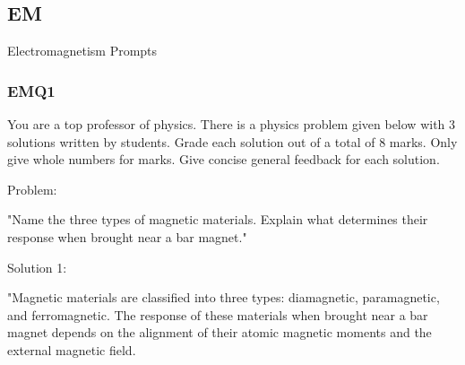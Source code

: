 




\subsection{EM}

Electromagnetism Prompts

\subsubsection{EMQ1}

You are a top professor of physics. There is a physics problem given below with 3 solutions written by students. Grade each solution out of a total of 8 marks. Only give whole numbers for marks. Give concise general feedback for each solution. 

Problem: 

"Name the three types of magnetic materials. Explain what determines their response when brought near a bar magnet."

Solution 1: 

"Magnetic materials are classified into three types: diamagnetic, paramagnetic, and ferromagnetic. The response of these materials when brought near a bar magnet depends on the alignment of their atomic magnetic moments and the external magnetic field.

